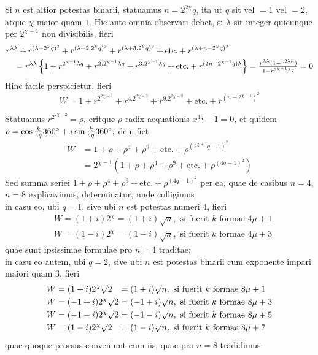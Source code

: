 \documentclass[twoside,12pt, showframe]{memoir}
\let\oldfrac\frac
\def\frac#1#2{\mathchoice{\tfrac{#1}{#2}}{\oldfrac{#1}{#2}}{\genfrac{}{}{}{2}{#1}{#2\mathstrut}}{\genfrac{}{}{}{3}{#1}{#2\mathstrut}}}
\begin{document}
Si \(n\) est altior potestas binarii, statuamus \(n=2^{2 \chi} q\), ita ut \(q\) sit vel \(=1\) vel \(=2\), atque \(\chi\) maior quam \(1\). Hic ante omnia observari debet, si \(\lambda\) sit integer quicunque per \(2^{\chi-1}\) non divisibilis, fieri
\[\begin{aligned}
& r^{\lambda \lambda}+r^{(\lambda+2^{\chi} q)^{2}}+r^{(\lambda+2.2^{\chi} q)^{2}}+r^{(\lambda+3.2^{\chi} q)^{2}}+\text{etc.}+r^{(\lambda+n-2^{\chi} q)^{2}} \\
& \quad=r^{\lambda \lambda}\left\{1+r^{2^{\chi+1} \lambda q}+r^{2.2^{\chi+1} \lambda q}+r^{3.2^{\chi+1} \lambda q}+\text{etc.}+r^{(2 n-2^{\chi+1} q) \lambda}\right\}=\frac{r^{\lambda \lambda}(1-r^{2 \lambda n})}{1-r^{2^{\chi+1} \lambda q}}=0
\end{aligned}\]
Hinc facile perspicietur, fieri
\[W=1+r^{2^{2 \chi-2}}+r^{4.2^{2 \chi-2}}+r^{9.2^{2 \chi-2}}+\text{etc.}+r^{(n-2^{\chi-1})^{2}}\]\clearpage\noindent%

Statuamus \(r^{2^{2 \chi-2}}=\rho\), eritque \(\rho\) radix aequationis \(x^{4 q}-1=0\), et quidem \(\rho=\cos \frac{k}{4 q} 360^{\circ}+i \sin \frac{k}{4 q} 360^{\circ};\) dein fiet
\[\begin{aligned}
W & =1+\rho+\rho^{4}+\rho^{9}+\text{etc.}+\rho^{(2^{\chi+1} q-1)^{2}} \\
& =2^{\chi-1}(1+\rho+\rho^{4}+\rho^{9}+\text{etc.}+\rho^{(4 q-1)^{2}})
\end{aligned}\]
Sed summa seriei \(1+\rho+\rho^{4}+\rho^{9}+\text{etc.}+\rho^{(4 q-1)^{2}}\) per ea, quae de casibus \(n=4\), \(n=8\) explicavimus, determinatur, unde colligimus\\
in casu eo, ubi \(q=1\), sive ubi \(n\) est potestas numeri 4, fieri
\[\begin{aligned}
& W=(1+i) 2^{\chi}=(1+i) \surd n, \text{ si fuerit } k \text{ formae } 4 \mu+1 \\
& W=(1-i) 2^{\chi}=(1-i) \surd n, \text{ si fuerit } k \text{ formae } 4 \mu+3
\end{aligned}\]
quae sunt ipsissimae formulae pro \(n=4\) traditae;\\
in casu eo autem, ubi \(q=2\), sive ubi \(n\) est potestas binarii cum exponente impari maiori quam 3, fieri
\[\begin{alignedat}[t]{2}
W&=(1+i) 2^{\chi} \surd 2&&=(1+i) \surd n, \text{ si fuerit } k \text{ formae } 8 \mu+1 \\
W&=(-1+i) 2^{\chi} \surd 2&&=(-1+i) \surd n, \text{ si fuerit } k \text{ formae } 8 \mu+3 \\
W&=(-1-i) 2^{\chi} \surd 2&&=(-1-i) \surd n, \text{ si fuerit } k \text{ formae } 8 \mu+5 \\
W&=(1-i) 2^{\chi} \surd 2&&=(1-i) \surd n, \text{ si fuerit } k \text{ formae } 8 \mu+7
\end{alignedat}\]
quae quoque prorsus conveniunt cum iis, quae pro \(n=8\) tradidimus.
\end{document}
